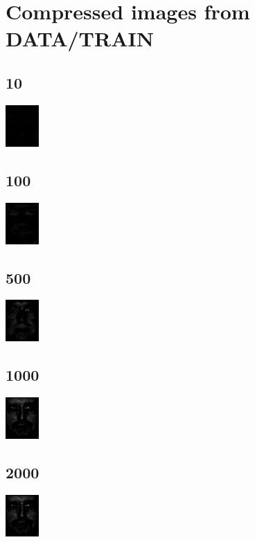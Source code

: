 \documentclass{article}
\begin{document}
\section{Compressed images from DATA/TRAIN}
\subsection{10}
\includegraphics{imgs/outk10.png}
\subsection{100}
\includegraphics{imgs/outk100.png}
\subsection{500}
\includegraphics{imgs/outk500.png}
\subsection{1000}
\includegraphics{imgs/outk1000.png}
\subsection{2000}
\includegraphics{imgs/outk2000.png}


\end{document}
